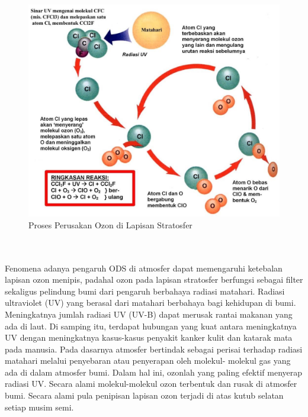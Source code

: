 \begin{figure}[h!]
    \centering
    \includegraphics[scale=0.3]{src/Pics/PROSES PERUSAKAN OZON DI LAPISAN STRATOSFER.jpg}
    \caption{Proses Perusakan Ozon di Lapisan Stratosfer}
    \label{fig:my_label}
\end{figure}\\~\\
Fenomena adanya pengaruh ODS di atmosfer dapat memengaruhi ketebalan lapisan ozon menipis, padahal ozon pada lapisan stratosfer berfungsi sebagai filter
sekaligus pelindung bumi dari pengaruh berbahaya radiasi matahari.
Radiasi ultraviolet (UV) yang berasal dari matahari berbahaya bagi kehidupan di
bumi. Meningkatnya jumlah radiasi UV (UV-B) dapat merusak rantai
makanan yang ada di laut. Di samping itu, terdapat hubungan yang kuat antara
meningkatnya UV dengan meningkatnya kasus-kasus penyakit kanker kulit dan
katarak mata pada manusia. Pada dasarnya atmosfer bertindak sebagai perisai
terhadap radiasi matahari melalui penyebaran atau penyerapan oleh molekul-
molekul gas yang ada di dalam atmosfer bumi. Dalam hal ini, ozonlah yang paling
efektif menyerap radiasi UV. Secara alami molekul-molekul ozon terbentuk dan
rusak di atmosfer bumi. Secara alami pula penipisan lapisan ozon terjadi di atas
kutub selatan setiap musim semi.

